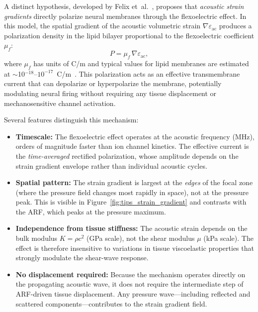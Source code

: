 \documentclass[11pt]{article}
\begin{document}
A distinct hypothesis, developed by Felix et~al.~\cite{felix2022flexo},
proposes that \emph{acoustic strain gradients} directly polarize neural
membranes through the flexoelectric effect.  In this model, the spatial
gradient of the acoustic volumetric strain $\nabla\varepsilon_{\mathrm{ac}}$
produces a polarization density in the lipid bilayer proportional to the
flexoelectric coefficient $\mu_f$:
\begin{equation}
  P = \mu_f \, \nabla\varepsilon_{\mathrm{ac}},
  \label{eq:flexo_polarization}
\end{equation}
where $\mu_f$ has units of C/m and typical values for lipid membranes are
estimated at $\sim$10$^{-18}$--$10^{-17}$~C/m~\cite{felix2022flexo}.  This polarization acts as an effective
transmembrane current that can depolarize or hyperpolarize the membrane,
potentially modulating neural firing without requiring any tissue
displacement or mechanosensitive channel activation.

Several features distinguish this mechanism:
\begin{itemize}[leftmargin=1.5em]
  \item \textbf{Timescale:} The flexoelectric effect operates at the
    acoustic frequency (MHz), orders of magnitude faster than ion channel
    kinetics.  The effective current is the \emph{time-averaged} rectified
    polarization, whose amplitude depends on the strain gradient envelope
    rather than individual acoustic cycles.
  \item \textbf{Spatial pattern:} The strain gradient is largest at the
    \emph{edges} of the focal zone (where the pressure field changes most
    rapidly in space), not at the pressure peak.  This is visible in
    Figure~\ref{fig:tips_strain_gradient} and contrasts with the ARF, which
    peaks at the pressure maximum.
  \item \textbf{Independence from tissue stiffness:} The acoustic strain
    depends on the bulk modulus $K = \rho c^2$ (GPa scale), not the shear
    modulus $\mu$ (kPa scale).  The effect is therefore insensitive to
    variations in tissue viscoelastic properties that strongly modulate the
    shear-wave response.
  \item \textbf{No displacement required:} Because the mechanism operates
    directly on the propagating acoustic wave, it does not require the
    intermediate step of ARF-driven tissue displacement.  Any pressure
    wave---including reflected and scattered components---contributes to the
    strain gradient field.
\end{itemize}
\end{document}
